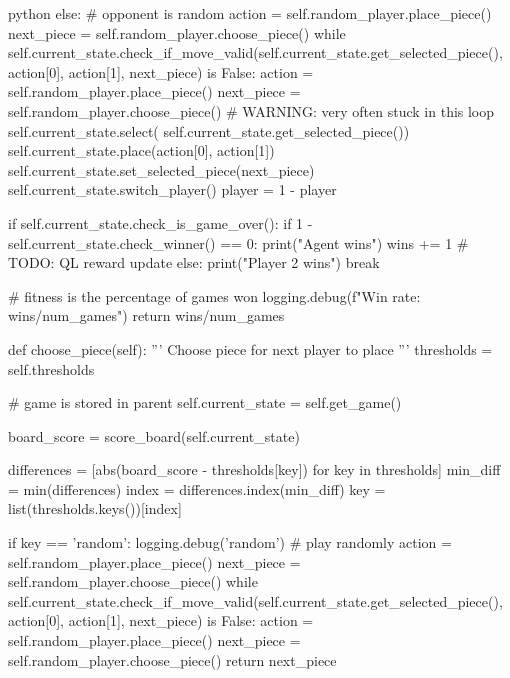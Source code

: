 \begin{mintedbox}{python}
                else:
                    # opponent is random
                    action = self.random_player.place_piece()
                    next_piece = self.random_player.choose_piece()
                    while self.current_state.check_if_move_valid(self.current_state.get_selected_piece(), action[0], action[1], next_piece) is False:
                        action = self.random_player.place_piece()
                        next_piece = self.random_player.choose_piece()
                        # WARNING: very often stuck in this loop
                    self.current_state.select(
                        self.current_state.get_selected_piece())
                    self.current_state.place(action[0], action[1])
                    self.current_state.set_selected_piece(next_piece)
                    self.current_state.switch_player()
                    player = 1 - player

                if self.current_state.check_is_game_over():
                    if 1 - self.current_state.check_winner() == 0:
                        print("Agent wins")
                        wins += 1
                        # TODO: QL reward update
                    else:
                        print("Player 2 wins")
                    break

        # fitness is the percentage of games won
        logging.debug(f"Win rate: {wins/num_games}")
        return wins/num_games

    def choose_piece(self):
        '''
        Choose piece for next player to place
        '''
        thresholds = self.thresholds

        # game is stored in parent
        self.current_state = self.get_game()

        board_score = score_board(self.current_state)

        differences = [abs(board_score - thresholds[key])
                        for key in thresholds]
        min_diff = min(differences)
        index = differences.index(min_diff)
        key = list(thresholds.keys())[index]

        if key == 'random':
            logging.debug('random')
            # play randomly
            action = self.random_player.place_piece()
            next_piece = self.random_player.choose_piece()
            while self.current_state.check_if_move_valid(self.current_state.get_selected_piece(), action[0], action[1], next_piece) is False:
                action = self.random_player.place_piece()
                next_piece = self.random_player.choose_piece()
            return next_piece


\end{mintedbox}
